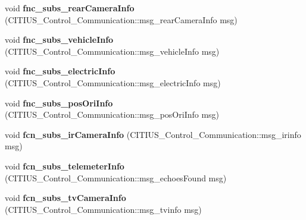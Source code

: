 \begin{DoxyCompactItemize}
\item 
\hypertarget{class_ros_node___communications_ab75f46f8503fdbfe01e3f5cd6e4bb725}{void {\bfseries fnc\-\_\-subs\-\_\-rear\-Camera\-Info} (\-C\-I\-T\-I\-U\-S\-\_\-\-Control\-\_\-\-Communication\-::msg\-\_\-rear\-Camera\-Info msg)}\label{class_ros_node___communications_ab75f46f8503fdbfe01e3f5cd6e4bb725}

\item 
\hypertarget{class_ros_node___communications_a5fa4b39d34f1c3366dc3892bc3ee3efe}{void {\bfseries fnc\-\_\-subs\-\_\-vehicle\-Info} (\-C\-I\-T\-I\-U\-S\-\_\-\-Control\-\_\-\-Communication\-::msg\-\_\-vehicle\-Info msg)}\label{class_ros_node___communications_a5fa4b39d34f1c3366dc3892bc3ee3efe}

\item 
\hypertarget{class_ros_node___communications_a734ce1f4132aaff9852513df7bd56960}{void {\bfseries fnc\-\_\-subs\-\_\-electric\-Info} (\-C\-I\-T\-I\-U\-S\-\_\-\-Control\-\_\-\-Communication\-::msg\-\_\-electric\-Info msg)}\label{class_ros_node___communications_a734ce1f4132aaff9852513df7bd56960}

\item 
\hypertarget{class_ros_node___communications_a2cabc78e7131793424eb182dac998dee}{void {\bfseries fnc\-\_\-subs\-\_\-pos\-Ori\-Info} (\-C\-I\-T\-I\-U\-S\-\_\-\-Control\-\_\-\-Communication\-::msg\-\_\-pos\-Ori\-Info msg)}\label{class_ros_node___communications_a2cabc78e7131793424eb182dac998dee}

\item 
\hypertarget{class_ros_node___communications_a3e195c4637115f337e26337d77ea7be5}{void {\bfseries fcn\-\_\-subs\-\_\-ir\-Camera\-Info} (\-C\-I\-T\-I\-U\-S\-\_\-\-Control\-\_\-\-Communication\-::msg\-\_\-irinfo msg)}\label{class_ros_node___communications_a3e195c4637115f337e26337d77ea7be5}

\item 
\hypertarget{class_ros_node___communications_ac2f9d7b9980b800185cad78b5a57f26b}{void {\bfseries fcn\-\_\-subs\-\_\-telemeter\-Info} (\-C\-I\-T\-I\-U\-S\-\_\-\-Control\-\_\-\-Communication\-::msg\-\_\-echoes\-Found msg)}\label{class_ros_node___communications_ac2f9d7b9980b800185cad78b5a57f26b}

\item 
\hypertarget{class_ros_node___communications_ac14aa31c82569facd5bbdc3a9dd3cfd6}{void {\bfseries fcn\-\_\-subs\-\_\-tv\-Camera\-Info} (\-C\-I\-T\-I\-U\-S\-\_\-\-Control\-\_\-\-Communication\-::msg\-\_\-tvinfo msg)}\label{class_ros_node___communications_ac14aa31c82569facd5bbdc3a9dd3cfd6}


\end{DoxyCompactItemize}
